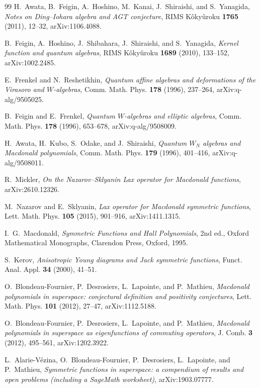 \documentclass[11pt]{amsart}
\theoremstyle{definition}
\theoremstyle{remark}
\begin{document}
{\begin{thebibliography}{99}
H.~Awata, B.~Feigin, A.~Hoshino, M.~Kanai, J.~Shiraishi, and S.~Yanagida,
\emph{Notes on Ding--Iohara algebra and AGT conjecture},
RIMS K\^oky\^uroku \textbf{1765} (2011), 12--32,
arXiv:1106.4088.

B.~Feigin, A.~Hoshino, J.~Shibahara, J.~Shiraishi, and S.~Yanagida,
\emph{Kernel function and quantum algebras},
RIMS K\^oky\^uroku \textbf{1689} (2010), 133--152,
arXiv:1002.2485.

E.~Frenkel and N.~Reshetikhin,
\emph{Quantum affine algebras and deformations of the Virasoro and \(W\)-algebras},
Comm. Math. Phys. \textbf{178} (1996), 237--264,
arXiv:q-alg/9505025.

B.~Feigin and E.~Frenkel,
\emph{Quantum \(W\)-algebras and elliptic algebras},
Comm. Math. Phys. \textbf{178} (1996), 653--678,
arXiv:q-alg/9508009.

H.~Awata, H.~Kubo, S.~Odake, and J.~Shiraishi,
\emph{Quantum \(W_N\) algebras and Macdonald polynomials},
Comm. Math. Phys. \textbf{179} (1996), 401--416,
arXiv:q-alg/9508011.

R.~Mickler,
\emph{On the Nazarov--Sklyanin Lax operator for Macdonald functions},
arXiv:2610.12326.

M.~Nazarov and E.~Sklyanin,
\emph{Lax operator for Macdonald symmetric functions},
Lett. Math. Phys. \textbf{105} (2015), 901--916,
arXiv:1411.1315.

I.~G.~Macdonald,
\emph{Symmetric Functions and Hall Polynomials}, 2nd ed.,
Oxford Mathematical Monographs, Clarendon Press, Oxford, 1995.

S.~Kerov,
\emph{Anisotropic Young diagrams and Jack symmetric functions},
Funct. Anal. Appl. \textbf{34} (2000), 41--51.

O.~Blondeau-Fournier, P.~Desrosiers, L.~Lapointe, and P.~Mathieu,
\emph{Macdonald polynomials in superspace: conjectural definition and positivity conjectures},
Lett. Math. Phys. \textbf{101} (2012), 27--47,
arXiv:1112.5188.

O.~Blondeau-Fournier, P.~Desrosiers, L.~Lapointe, and P.~Mathieu,
\emph{Macdonald polynomials in superspace as eigenfunctions of commuting operators},
J. Comb. \textbf{3} (2012), 495--561,
arXiv:1202.3922.

L.~Alarie-V\'ezina, O.~Blondeau-Fournier, P.~Desrosiers, L.~Lapointe, and P.~Mathieu,
\emph{Symmetric functions in superspace: a compendium of results and open problems (including a
SageMath worksheet)},
arXiv:1903.07777.


\end{thebibliography}}
\end{document}
